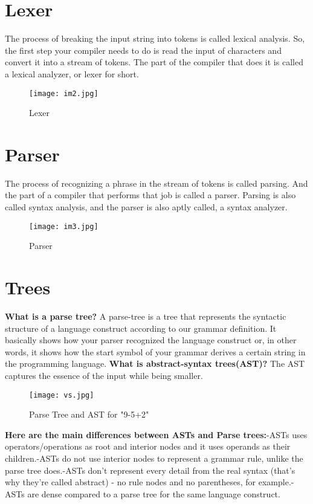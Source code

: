 \documentclass{book}
\begin{document}
\section{Lexer}
    The process of breaking the input string into tokens is called lexical analysis. So, the first step your compiler needs to do is read the input of characters and convert it into a stream of tokens. The part of the compiler that does it is called a lexical analyzer, or lexer for short.

\begin{figure}[ht!]
\centering
\texttt{[image: im2.jpg]}
\caption{Lexer \label{overflow}}
\end{figure}
    
\section{Parser}
    The process of recognizing a phrase in the stream of tokens is called parsing. And the part of a compiler that performs that job is called a parser. Parsing is also called syntax analysis, and the parser is also aptly called, a syntax analyzer.
    
\begin{figure}[ht!]
\centering
\texttt{[image: im3.jpg]}
\caption{Parser \label{overflow}}
\end{figure}


\section{Trees}
    \textbf{What is a parse tree?} A parse-tree is a tree that represents the syntactic structure of a language construct according to our grammar definition. It basically shows how your parser recognized the language construct or, in other words, it shows how the start symbol of your grammar derives a certain string in the programming language.\newline
\textbf{What is abstract-syntax trees(AST)?} The AST captures the essence of the input while being smaller.
    
\begin{figure}[ht!]
\centering
\texttt{[image: vs.jpg]}
\caption{Parse Tree and AST for "9-5+2"\label{overflow}}
\end{figure}

\textbf{Here are the main differences between ASTs and Parse trees:}\newline{}-ASTs uses operators/operations as root and interior nodes and it uses operands as their children.-ASTs do not use interior nodes to represent a grammar rule, unlike the parse tree does.-ASTs don’t represent every detail from the real syntax (that’s why they’re called abstract) - no rule nodes and no parentheses, for example.-ASTs are dense compared to a parse tree for the same language construct.\newline
\end{document}
